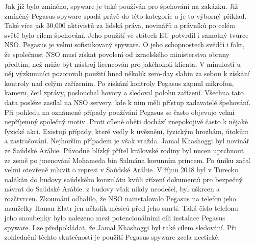 Jak již bylo zmíněno, spyware je také používán pro špehování na zakázku.
Již zmíněný Pegasus spyware spadá právě do této kategorie a je to výborný příklad.
Také více jak 30,000 aktivistů za lidská práva, novinářů a právníků po celém světě bylo cílem špehování.
Jeho použití ve státech \ac{EU} potvrdil i samotný tvůrce NSO\@.
Pegasus je velmi sofistikovaný spyware.
O jeho schopnostech svědčí i fakt, že společnost NSO musí získat povolení od izraelského ministerstva obrany předtím, než může být nástroj licencován pro jakéhokoli klienta.
V minulosti u něj výzkumníci pozorovali použití hned několik zero-day slabin za sebou k získání kontroly nad celým zařízením.
Po získání kontroly Pegasus zapnul mikrofon, kameru, četl zprávy, poslouchal hovory a sledoval polohu zařízení.
Všechna tato data posléze zasílal na NSO servery, kde k nim měli přístup zadavatelé špehování.
Při pohledu na oznámené případy používání Pegasus se často objevuje velmi nepříjemný společný motiv.
Proti cílené oběti dochází znepokojivě často k nějaké fyzické akci.
Existují případy, které vedly k uvěznění, fyzickým hrozbám, útokům a zastrašování.
Nejhorším případem je však vražda.
Jamal Khashoggi byl novinář ze Saúdské Arábie.
Původně blízký přítel královské rodiny byl nucen uprchnout ze země po jmenování Mohameda bin Salmána korunním princem.
Po úniku začal velmi otevřeně mluvit o represi v Saúdské Arábie.
V říjnu 2018 byl v Turecku nalákán do budovy saúdského konzulátu kvůli zřízení dokumentů pro bezpečný návrat do Saúdské Arábie.
z budovy však nikdy neodešel, byl uškrcen a rozčtvrcen.
Zkoumání odhalilo, že NSO nainstalovalo Pegasus na telefon jeho manželky Hanan Elatr jen několik měsíců před jeho smrtí\cite{khashoggi_wife_pegasus}.
Taká číslo telefonu jeho snoubenky bylo nalezeno mezi potencionálními cíli instalace Pegasus spyware.
Lze předpokládat, že Jamal Khashoggi byl také cílem sledování.
Při zohlednění těchto skutečností je použití Pegasus spyware zcela neetické.\cite{darknet_100_NSO,Enisa_thread_landscape}

